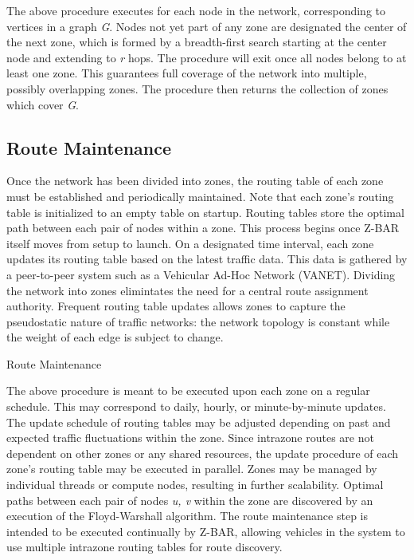 \documentclass[conference]{IEEEtran}
\begin{document}

The above procedure executes for each node in the network, corresponding to vertices in a graph \textit{G}. Nodes not yet part of any zone are designated the center of the next zone, which is formed by a breadth-first search starting at the center node and extending to \textit{r} hops. The procedure will exit once all nodes belong to at least one zone. This guarantees full coverage of the network into multiple, possibly overlapping zones. The procedure then returns the collection of zones which cover \textit{G}.

\subsection{Route Maintenance}

Once the network has been divided into zones, the routing table of each zone must be established and periodically maintained. Note that each zone's routing table is initialized to an empty table on startup. Routing tables store the optimal path between each pair of nodes within a zone. This process begins once Z-BAR itself moves from setup to launch. On a designated time interval, each zone updates its routing table based on the latest traffic data. This data is gathered by a peer-to-peer system such as a Vehicular Ad-Hoc Network (VANET). Dividing the network into zones elimintates the need for a central route assignment authority. Frequent routing table updates allows zones to capture the pseudostatic nature of traffic networks: the network topology is constant while the weight of each edge is subject to change.

\begin{algorithm}[H]
  \caption{Route Maintenance}
  \label{route_maintenance}
  \begin{algorithmic}[1]
  \EndFor
  \EndProcedure
  \end{algorithmic}
\end{algorithm}

The above procedure is meant to be executed upon each zone on a regular schedule. This may correspond to daily, hourly, or minute-by-minute updates. The update schedule of routing tables may be adjusted depending on past and expected traffic fluctuations within the zone. Since intrazone routes are not dependent on other zones or any shared resources, the update procedure of each zone's routing table may be executed in parallel. Zones may be managed by individual threads or compute nodes, resulting in further scalability. Optimal paths between each pair of nodes \textit{u, v} within the zone are discovered by an execution of the Floyd-Warshall algorithm. The route maintenance step is intended to be executed continually by Z-BAR, allowing vehicles in the system to use multiple intrazone routing tables for route discovery.
\end{document}
